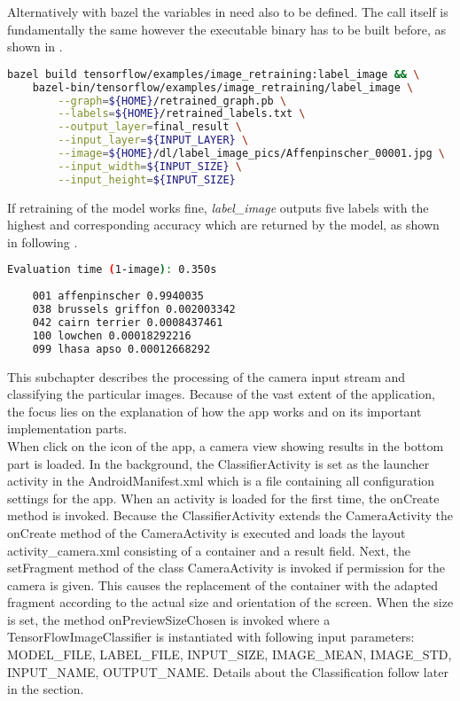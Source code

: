 Alternatively with bazel the variables in  need also to be defined. The call itself is fundamentally the same however the executable binary has to be built before, as shown in .

\begin{lstlisting}[caption=Build and call of \textit{label\_image}, label=list:blabel_image, language=bash]
	bazel build tensorflow/examples/image_retraining:label_image && \
	bazel-bin/tensorflow/examples/image_retraining/label_image \
		--graph=${HOME}/retrained_graph.pb \
		--labels=${HOME}/retrained_labels.txt \
		--output_layer=final_result \
		--input_layer=${INPUT_LAYER} \
		--image=${HOME}/dl/label_image_pics/Affenpinscher_00001.jpg \
		--input_width=${INPUT_SIZE} \
		--input_height=${INPUT_SIZE}
\end{lstlisting}

If retraining of the model works fine, \textit{label\_image} outputs five labels with the highest and corresponding accuracy which are returned by the model, as shown in following .
\begin{lstlisting}[caption=Output of \textit{label\_image.py}, label=list:label_imageOutput, language=bash]
	Evaluation time (1-image): 0.350s
	
	001 affenpinscher 0.9940035
	038 brussels griffon 0.002003342
	042 cairn terrier 0.0008437461
	100 lowchen 0.00018292216
	099 lhasa apso 0.00012668292
\end{lstlisting}

This subchapter describes the processing of the camera input stream and classifying the particular images. Because of the vast extent of the application, the focus lies on the explanation of how the app works and on its important implementation parts. \\

When click on the icon of the app, a camera view showing results in the bottom part is loaded. In the background, the ClassifierActivity is set as the launcher activity in the AndroidManifest.xml which is a file containing all configuration settings for the app. When an activity is loaded for the first time, the onCreate method is invoked. Because the ClassifierActivity extends the CameraActivity the onCreate method of the CameraActivity is executed and loads the layout activity_camera.xml consisting of a container and a result field. Next, the setFragment method of the class CameraActivity is invoked if permission for the camera is given. This causes the replacement of the container with the adapted fragment according to the actual size and orientation of the screen. When the size is set, the method onPreviewSizeChosen is invoked where a TensorFlowImageClassifier is instantiated with following input parameters: MODEL_FILE, LABEL_FILE, INPUT_SIZE, IMAGE_MEAN, IMAGE_STD, INPUT_NAME, OUTPUT_NAME. Details about the Classification follow later in the section.\\

